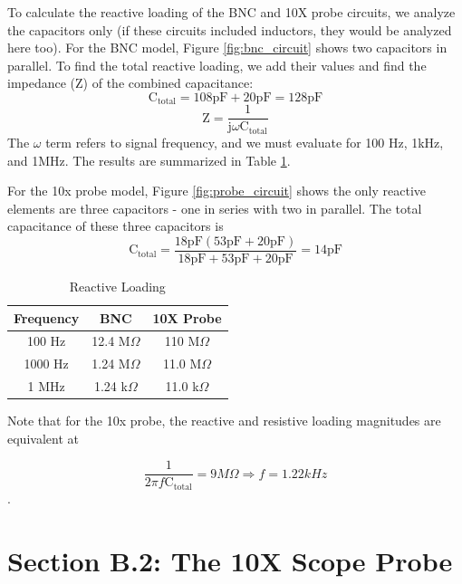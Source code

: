 \documentclass[12pt,letterpaper]{report}
\begin{document}
To calculate the reactive loading of the BNC and 10X probe circuits, we analyze the capacitors only (if these circuits included inductors, they would be analyzed here too). For the BNC model, Figure \ref{fig:bnc_circuit} shows two capacitors in parallel. To find the total reactive loading, we add their values and find the impedance (Z) of the combined capacitance:
$$ \text{C}_{\text{total}} = 108 \text{pF} + 20 \text{pF} = 128 \text{pF} $$
$$ \text{Z} = \frac{1}{\text{j}\omega\text{C}_{\text{total}}} $$
The $\omega$ term refers to signal frequency, and we must evaluate for 100 Hz, 1kHz, and 1MHz. The results are summarized in Table \ref{table:ReactiveLoading}.

For the 10x probe model, Figure \ref{fig:probe_circuit} shows the only reactive elements are three capacitors - one in series with two in parallel. The total capacitance of these three capacitors is
$$ \text{C}_{\text{total}} = \frac{18 \text{pF} (53 \text{pF} + 20 \text{pF})}{18 \text{pF} + 53 \text{pF} + 20 \text{pF}} = 14 \text{pF} $$

 
\begin{center}
\begin{table}[ht]
\caption{Reactive Loading}
\centering
	\begin{tabular}{| c | c | c |}
	\hline	
	Frequency & BNC & 10X Probe \\
	\hline
	100 Hz & 12.4 M$\Omega$ & 110 M$\Omega$\\
	1000 Hz & 1.24 M$\Omega$ & 11.0 M$\Omega$\\
	1 MHz & 1.24 k$\Omega$ & 11.0 k$\Omega$\\	
	\hline
	\end{tabular}
	\label{table:ReactiveLoading}
\end{table}
\end{center}

Note that for the 10x probe, the reactive and resistive loading magnitudes are equivalent at

$$ \frac{1}{2 \pi f\text{C}_{\text{total}}} = 9 M\Omega \Rightarrow f = 1.22 kHz $$.

\section*{Section B.2: The 10X Scope Probe}
\end{document}
